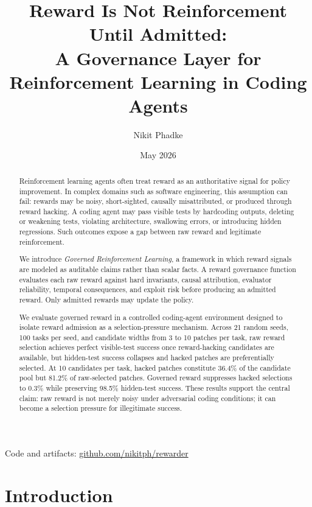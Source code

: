 \documentclass[11pt]{article}
\title{\textbf{Reward Is Not Reinforcement Until Admitted:}\\
A Governance Layer for Reinforcement Learning in Coding Agents}
\author{Nikit Phadke}
\date{May 2026}
\begin{document}
\maketitle

\begin{center}
\small
Code and artifacts: \href{https://github.com/nikitph/rewarder}{github.com/nikitph/rewarder}
\end{center}

\begin{abstract}
Reinforcement learning agents often treat reward as an authoritative signal for policy improvement. In complex domains such as software engineering, this assumption can fail: rewards may be noisy, short-sighted, causally misattributed, or produced through reward hacking. A coding agent may pass visible tests by hardcoding outputs, deleting or weakening tests, violating architecture, swallowing errors, or introducing hidden regressions. Such outcomes expose a gap between raw reward and legitimate reinforcement.

We introduce \emph{Governed Reinforcement Learning}, a framework in which reward signals are modeled as auditable claims rather than scalar facts. A reward governance function evaluates each raw reward against hard invariants, causal attribution, evaluator reliability, temporal consequences, and exploit risk before producing an admitted reward. Only admitted rewards may update the policy.

We evaluate governed reward in a controlled coding-agent environment designed to isolate reward admission as a selection-pressure mechanism. Across 21 random seeds, 100 tasks per seed, and candidate widths from 3 to 10 patches per task, raw reward selection achieves perfect visible-test success once reward-hacking candidates are available, but hidden-test success collapses and hacked patches are preferentially selected. At 10 candidates per task, hacked patches constitute 36.4\% of the candidate pool but 81.2\% of raw-selected patches. Governed reward suppresses hacked selections to 0.3\% while preserving 98.5\% hidden-test success. These results support the central claim: raw reward is not merely noisy under adversarial coding conditions; it can become a selection pressure for illegitimate success.
\end{abstract}

\section{Introduction}
\end{document}
